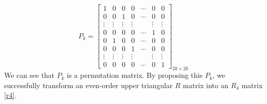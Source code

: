 \documentclass[1p]{elsarticle}
\numberwithin{equation}{section}
\begin{document}
\begin{equation}\label{p}
    P_k = \begin{bmatrix} 
            1 & 0 & 0 & 0 & \cdots & 0 & 0\\ 
            0 & 0 & 1 & 0 & \cdots & 0 & 0\\ 
            \vdots & \vdots & \vdots & \vdots &  & \vdots & \vdots\\ 
            0 & 0 & 0 & 0 & \cdots & 1 & 0 \\
            0 & 1 & 0 & 0 & \cdots & 0 & 0\\ 
            0 & 0 & 0 & 1 & \cdots & 0 & 0\\ 
            \vdots & \vdots & \vdots & \vdots &  & \vdots & \vdots\\ 
            0 & 0 & 0 & 0 &\cdots & 0 & 1 
        \end{bmatrix}_{2k \times 2k}
\end{equation}
{\color{red} We can see that $P_k$ is a permutation matrix. By proposing this $P_k$, we successfully transform an even-order upper triangular $R$ matrix into an $R_4$ matrix \eqref{r4}.}
\end{document}
